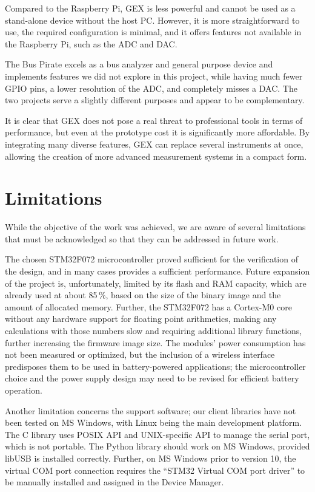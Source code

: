 Compared to the Raspberry Pi, GEX is less powerful and cannot be used as a stand-alone device without the host \gls{PC}. However, it is more straightforward to use, the required configuration is minimal, and it offers features not available in the Raspberry Pi, such as the \gls{ADC} and \gls{DAC}.

The Bus Pirate excels as a bus analyzer and general purpose device and implements features we did not explore in this project, while having much fewer \gls{GPIO} pins, a lower resolution of the \gls{ADC}, and completely misses a \gls{DAC}. The two projects serve a slightly different purposes and appear to be complementary.

It is clear that GEX does not pose a real threat to professional tools in terms of performance, but even at the prototype cost it is significantly more affordable. By integrating many diverse features, GEX can replace several instruments at once, allowing the creation of more advanced measurement systems in a compact form.

\section{Limitations}

While the objective of the work was achieved, we are aware of several limitations that must be acknowledged so that they can be addressed in future work.

The chosen STM32F072 microcontroller proved sufficient for the verification of the design, and in many cases provides a sufficient performance. Future expansion of the project is, unfortunately, limited by its flash and \gls{RAM} capacity, which are already used at about 85\,\%, based on the size of the binary image and the amount of allocated memory. Further, the STM32F072 has a Cortex-M0 core without any hardware support for floating point arithmetics, making any calculations with those numbers slow and requiring additional library functions, further increasing the firmware image size. The modules' power consumption has not been measured or optimized, but the inclusion of a wireless interface predisposes them to be used in battery-powered applications; the microcontroller choice and the power supply design may need to be revised for efficient battery operation.

Another limitation concerns the support software; our client libraries have not been tested on MS Windows, with Linux being the main development platform. The C library uses POSIX \gls{API} and UNIX-specific \gls{API} to manage the serial port, which is not portable. The Python library should work on MS Windows, provided libUSB is installed correctly. Further, on MS Windows prior to version 10, the virtual COM port connection requires the ``STM32 Virtual COM port driver'' to be manually installed and assigned in the Device Manager. 


